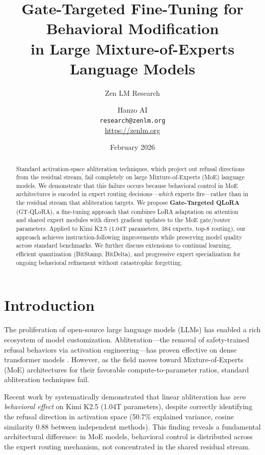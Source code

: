 \documentclass[11pt,a4paper]{article}
\title{Gate-Targeted Fine-Tuning for Behavioral Modification\\in Large Mixture-of-Experts Language Models}
\author{
  Zen LM Research \and Hanzo AI\\
  \texttt{research@zenlm.org}\\
  \url{https://zenlm.org}
}
\date{February 2026}
\begin{document}
\maketitle

\begin{abstract}
Standard activation-space abliteration techniques, which project out refusal directions from the residual stream, fail completely on large Mixture-of-Experts (MoE) language models. We demonstrate that this failure occurs because behavioral control in MoE architectures is encoded in expert routing decisions—\textit{which} experts fire—rather than in the residual stream that abliteration targets. We propose \textbf{Gate-Targeted QLoRA} (GT-QLoRA), a fine-tuning approach that combines LoRA adaptation on attention and shared expert modules with direct gradient updates to the MoE gate/router parameters. Applied to Kimi K2.5 (1.04T parameters, 384 experts, top-8 routing), our approach achieves instruction-following improvements while preserving model quality across standard benchmarks. We further discuss extensions to continual learning, efficient quantization (BitStamp, BitDelta), and progressive expert specialization for ongoing behavioral refinement without catastrophic forgetting.
\end{abstract}

\section{Introduction}

The proliferation of open-source large language models (LLMs) has enabled a rich ecosystem of model customization. Abliteration—the removal of safety-trained refusal behaviors via activation engineering—has proven effective on dense transformer models \citep{arditi2024refusal}. However, as the field moves toward Mixture-of-Experts (MoE) architectures for their favorable compute-to-parameter ratios, standard abliteration techniques fail.

Recent work by \citet{hamsaomar2025} systematically demonstrated that linear abliteration has \textit{zero behavioral effect} on Kimi K2.5 (1.04T parameters), despite correctly identifying the refusal direction in activation space (50.7\% explained variance, cosine similarity 0.88 between independent methods). This finding reveals a fundamental architectural difference: in MoE models, behavioral control is distributed across the expert routing mechanism, not concentrated in the shared residual stream.
\end{document}
